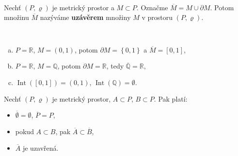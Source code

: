 \begin{definice}
Nechť $(P,\varrho)$ je metrický prostor a $M\subset P$. Označme
$
\overline{M}=M\cup \partial M.
$
Potom množinu $\overline{M}$ nazýváme \textbf{uzávěrem} množiny $M$ v prostoru $(P,\varrho)$.
\end{definice}

\begin{priklad}
	\,
	\begin{enumerate}[(a)]
		\item $P=\mathbb R $, $M = (0,1)$, potom $\partial M = \left \{ 0,1 \right \} $ a $\overline M = [0,1]$,
		\item $P=\mathbb R $, $M=\mathbb Q $, potom $\partial M=\mathbb R $, tedy $\overline {\mathbb Q} =\mathbb R $,
		\item $\operatorname{Int}([0,1])=(0,1)$, $\operatorname {Int}(\mathbb Q )=\emptyset$.
	\end{enumerate}
\end{priklad}

\begin{veta}\label{veta9.5}
Nechť $(P,\varrho)$ je metrický prostor, $A\subset P$, $B\subset P$. Pak platí:

\begin{itemize}
    \item[(a)] $\overline{\emptyset}=\emptyset$, $\overline{P}=P$,

    \item[(b)] pokud $A\subset B$, pak $\overline{A}\subset \overline{B}$,

    \item[(c)] $\overline{A}$ je uzavřená.
\end{itemize}
\end{veta}

